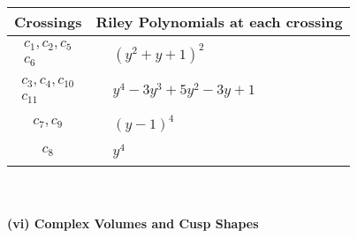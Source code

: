 \documentclass[1p]{elsarticle_modified}
\theoremstyle{definition}
\begin{document}
\begin{tabular}{m{50pt}|m{274pt}}
Crossings & \hspace{64pt}Riley Polynomials at each crossing \\
\hline $$\begin{aligned}c_{1},c_{2},c_{5}\\c_{6}\end{aligned}$$&$\begin{aligned}
&(y^2+y+1)^2
\end{aligned}$\\
\hline $$\begin{aligned}c_{3},c_{4},c_{10}\\c_{11}\end{aligned}$$&$\begin{aligned}
&y^4-3 y^3+5 y^2-3 y+1
\end{aligned}$\\
\hline $$\begin{aligned}c_{7},c_{9}\end{aligned}$$&$\begin{aligned}
&(y-1)^4
\end{aligned}$\\
\hline $$\begin{aligned}c_{8}\end{aligned}$$&$\begin{aligned}
&y^4
\end{aligned}$\\
\hline
\end{tabular}\\~\\
\newpage\flushleft \textbf{(vi) Complex Volumes and Cusp Shapes}
\end{document}
